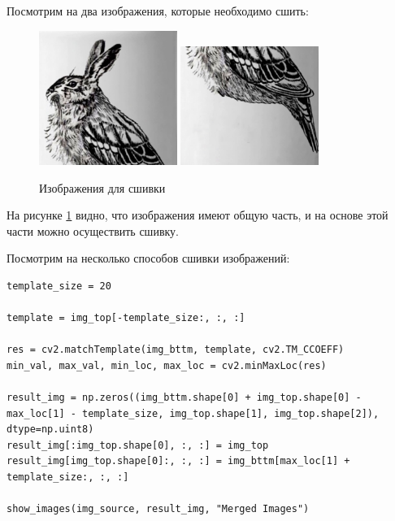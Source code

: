 Посмотрим на два изображения, которые необходимо сшить:

\begin{figure}[ht]
    \centering
    \includegraphics[width=0.4\textwidth]{../zaebushek_top.png}
    \includegraphics[width=0.40\textwidth]{../zaebushek_bttm.png}
    \caption{Изображения для сшивки}
    \label{fig:stitch_images}
\end{figure}

На рисунке \ref{fig:stitch_images} видно, что изображения имеют общую часть, и на основе этой части можно осуществить сшивку.

Посмотрим на несколько способов сшивки изображений:

\begin{lstlisting}[style=python_white, caption={Исходный код для сшивки изображений}]
template_size = 20

template = img_top[-template_size:, :, :]

res = cv2.matchTemplate(img_bttm, template, cv2.TM_CCOEFF)
min_val, max_val, min_loc, max_loc = cv2.minMaxLoc(res)

result_img = np.zeros((img_bttm.shape[0] + img_top.shape[0] - max_loc[1] - template_size, img_top.shape[1], img_top.shape[2]), dtype=np.uint8)
result_img[:img_top.shape[0], :, :] = img_top
result_img[img_top.shape[0]:, :, :] = img_bttm[max_loc[1] + template_size:, :, :]

show_images(img_source, result_img, "Merged Images")
\end{lstlisting}

